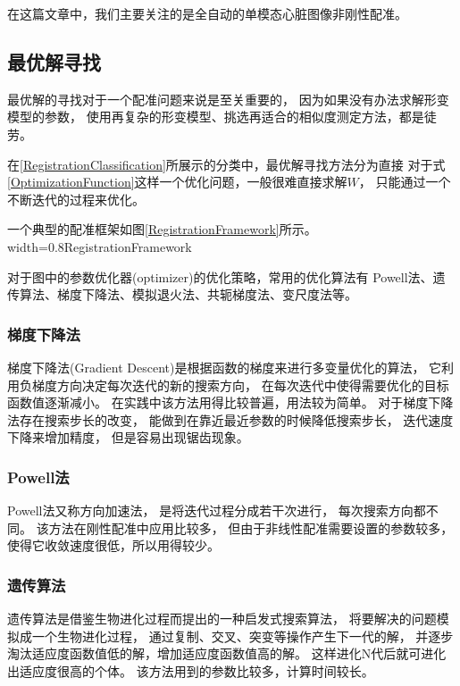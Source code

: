 在这篇文章中，我们主要关注的是全自动的单模态心脏图像非刚性配准。





\subsection{最优解寻找}\label{SectionOptimization}
最优解的寻找对于一个配准问题来说是至关重要的，
因为如果没有办法求解形变模型的参数，
使用再复杂的形变模型、挑选再适合的相似度测定方法，都是徒劳。

在\ref{RegistrationClassification}所展示的分类中，最优解寻找方法分为直接
对于式\ref{OptimizationFunction}这样一个优化问题，一般很难直接求解$W$，
只能通过一个不断迭代的过程来优化。

一个典型的配准框架如图\ref{RegistrationFramework}所示。
%
{width=0.8\textwidth}{RegistrationFramework}

对于图中的参数优化器(optimizer)的优化策略，常用的优化算法有
Powell法、遗传算法、梯度下降法、模拟退火法、共轭梯度法、变尺度法等。
\subsubsection{梯度下降法}
梯度下降法(Gradient Descent)是根据函数的梯度来进行多变量优化的算法，
它利用负梯度方向决定每次迭代的新的搜索方向，
在每次迭代中使得需要优化的目标函数值逐渐减小。
在实践中该方法用得比较普遍，用法较为简单。
对于梯度下降法存在搜索步长的改变，
能做到在靠近最近参数的时候降低搜索步长，
迭代速度下降来增加精度，
但是容易出现锯齿现象。

\subsubsection{Powell法}
Powell法又称方向加速法，
是将迭代过程分成若干次进行，
每次搜索方向都不同。
该方法在刚性配准中应用比较多，
但由于非线性配准需要设置的参数较多，
使得它收敛速度很低，所以用得较少。

\subsubsection{遗传算法}
遗传算法是借鉴生物进化过程而提出的一种启发式搜索算法，
将要解决的问题模拟成一个生物进化过程，
通过复制、交叉、突变等操作产生下一代的解，
并逐步淘汰适应度函数值低的解，增加适应度函数值高的解。
这样进化N代后就可进化出适应度很高的个体。
该方法用到的参数比较多，计算时间较长。

